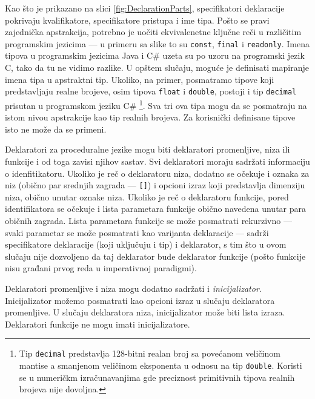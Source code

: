 Kao što je prikazano na slici \ref{fig:DeclarationParts}, specifikatori deklaracije pokrivaju kvalifikatore, specifikatore pristupa i ime tipa. Pošto se pravi zajednička apstrakcija, potrebno je uočiti ekvivalenetne ključne reči u različitim programskim jezicima --- u primeru sa slike to su \texttt{const}, \texttt{final} i \texttt{readonly}. Imena tipova u programskim jezicima Java i C\# uzeta su po uzoru na programski jezik C, tako da tu ne vidimo razlike. U opštem slučaju, moguće je definisati mapiranje imena tipa u apstraktni tip. Ukoliko, na primer, posmatramo tipove koji predstavljaju realne brojeve, osim tipova \texttt{float} i \texttt{double}, postoji i tip \texttt{decimal} prisutan u programskom jeziku C\# \footnote{Tip \texttt{decimal} predstavlja 128-bitni realan broj sa povećanom veličinom mantise a smanjenom veličinom eksponenta u odnosu na tip \texttt{double}. Koristi se u numeričkm izračunavanjima gde preciznost primitivnih tipova realnih brojeva nije dovoljna.}. Sva tri ova tipa mogu da se posmatraju na istom nivou apstrakcije kao tip realnih brojeva. Za korisnički definisane tipove isto ne može da se primeni.

Deklaratori za proceduralne jezike mogu biti deklaratori promenljive, niza ili funkcije i od toga zavisi njihov sastav. Svi deklaratori moraju sadržati informaciju o idenfitikatoru. Ukoliko je reč o deklaratoru niza, dodatno se očekuje i oznaka za niz (obično par srednjih zagrada --- \texttt{[]}) i opcioni izraz koji predstavlja dimenziju niza, obično unutar oznake niza. Ukoliko je reč o deklaratoru funkcije, pored identifikatora se očekuje i lista parametara funkcije obično navedena unutar para običnih zagrada. Lista parametara funkcije se može posmatrati rekurzivno --- svaki parametar se može posmatrati kao varijanta deklaracije --- sadrži specifikatore deklaracije (koji uključuju i tip) i deklarator, s tim što u ovom slučaju nije dozvoljeno da taj deklarator bude deklarator funkcije (pošto funkcije nisu građani prvog reda u imperativnoj paradigmi). 

Deklaratori promenljive i niza mogu dodatno sadržati i \emph{inicijalizator}. Inicijalizator možemo posmatrati kao opcioni izraz u slučaju deklaratora promenljive. U slučaju deklaratora niza, inicijalizator može biti lista izraza. Deklaratori funkcije ne mogu imati inicijalizatore.

